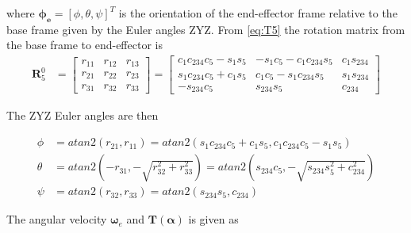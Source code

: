 where $\bm{\phi_e} = [\phi,\theta,\psi]^T$ is the orientation of the end-effector frame relative to the base frame given by the Euler angles ZYZ. From \eqref{eq:T5} the rotation matrix from the base frame to end-effector is
\begin{align*}
    \bm{R}_5^0 &= 
    \begin{bmatrix}
        r_{11} & r_{12} & r_{13}\\
        r_{21} & r_{22} & r_{23}\\
        r_{31} & r_{32} & r_{33}
    \end{bmatrix}
    =
    \begin{bmatrix}
        c_1c_{234}c_5 - s_1s_5 & -s_1c_5 - c_1c_{234}s_5 & c_1s_{234}\\
        s_1c_{234}c_5 + c_1s_5 & c_1c_5 - s_1c_{234}s_5 & s_1s_{234}\\
        -s_{234}c_5 & s_{234}s_5 & c_{234} 
    \end{bmatrix}
\end{align*}

The ZYZ Euler angles are then


\begin{align*}
    \phi &= atan2(r_{21},r_{11}) = atan2(s_1c_{234}c_5 + c_1s_5,c_1c_{234}c_5 - s_1s_5)\\
    \theta &= atan2\left(-r_{31},-\sqrt{r_{32}^2+r_{33}^2}\right) = atan2\left(s_{234}c_5,-\sqrt{s_{234}s_5^2+c_{234}^2}\right)\\
    \psi &= atan2(r_{32},r_{33}) = atan2(s_{234}s_5,c_{234})
\end{align*}

The angular velocity $\bm{\omega}_e$ and $\bm{T}(\bm{\alpha})$ is given as

